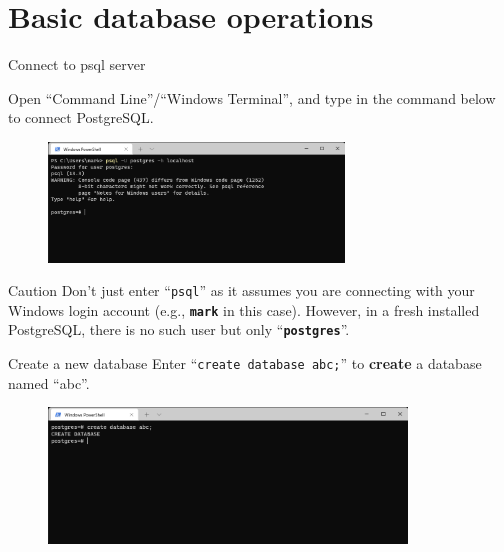 \section*{Basic database operations}

\begin{frame}[fragile]{Connect to psql server}

Open ``Command Line''/``Windows Terminal'', and type in the command below to connect PostgreSQL.
\begin{figure}
	\includegraphics[width=0.7\textwidth]{t0-psql/images/1.png}
\end{figure}

\begin{alertblock}{Caution}
	Don't just enter ``\texttt{psql}'' as it assumes you are connecting with your Windows login account (e.g., \texttt{\textbf{mark}} in this case). However, in a fresh installed PostgreSQL, there is no such user but only ``\texttt{\textbf{postgres}}''. 
\end{alertblock}

\end{frame}

\begin{frame}[fragile]{Create a new database}
	Enter ``\texttt{create database abc;}'' to \textbf{create} a database named ``abc''.
	\begin{figure}
		\includegraphics[width=0.85\textwidth]{t0-psql/images/3.png}
	\end{figure}
	
\end{frame}

